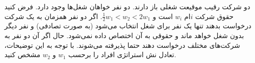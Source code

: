دو شرکت رقیب موقیعت شغلی باز دارند. دو نفر خواهان شغل‌ها وجود دارد. فرض کنید حقوق شرکت
$i$ام
$w_i$
است و  
$\frac{1}{2}w_1 < w_2 < 2 w_1$.
اگر دو نفر همزمان به یک شرکت درخواست بدهند تنها یک نفر برای شغل انتخاب می‌شود (به صورت تصادفی) و نفر دیگر بدون شغل خواهد ماند و حقوقی به آن اختصاص داده نمی‌شود. حال اگر آن دو نفر به شرکت‌های مختلف درخواست دهند حتما پذیرفته می‌شوند. با توجه به این توضیحات، تعادل نش استراتژی افراد را برحسب 
$w_1$
و
$w_2$
مشخص کنید.